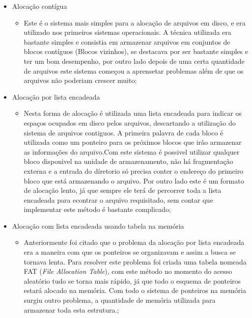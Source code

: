 \documentclass{article}
\begin{document}
\begin{itemize}

\item Alocação contígua

	\begin{itemize}
		\item Este é o sistema mais simples para a alocação de arquivos em disco, e era utilizado nos primeiros sistemas operacionais. A técnica utilizada era bastante simples e consistia em armazenar arquivos em conjuntos de blocos contíguos (Blocos vizinhos), se destacava por ser bastante simples e ter um bom desempenho, por outro lado depois de uma certa quantidade de arquivos este sistema começou a aprensetar problemas além de que os arquivos não poderiam crescer muito;
	\end{itemize}


\item Alocação por lista encadeada
	
	\begin{itemize}
		\item Nesta forma de alocação é utilizada uma lista encadeada para indicar os espaços ocupados em disco pelos arquivos, descartando a utilização do sistema de arquivos contiguos. A primeira palavra de cada bloco é utilizada como um ponteiro para os próximos blocos que irão armazenar as informações do arquivo.Com este sistema é possivel utilizar qualquer bloco disponivel na unidade de armazenamento, não há fragmentação externa e a entrada do díretorio só precisa conter o endereço do primeiro bloco que está armazenando o arquivo. Por outro lado este é um formato de alocação lento, já que sempre ele terá de percorrer toda a lista encadeada para econtrar o arquivo requisitado, sem contar que implementar este método é bastante complicado;
	\end{itemize}


\item Alocação com lista encadeada usando tabela na memória

	\begin{itemize}
		\item Anteriormente foi citado que o problema da alocação por lista encadeada era a maneira com que os ponteiros se organizavam e assim a busca se tornava lenta. Para resolver este problema foi criada uma tabela nomeada FAT (\textit{File Allocation Table}), com este método no momento do acesso aleatório tudo se torna mais rápido, já que todo o esquema de ponteiros estará alocado na memória. Com todo o sistema de ponteiros na memória surgiu outro problema, a quantidade de memória utilizada para armazenar toda esta estrutura.;
	\end{itemize}


\end{itemize}
\end{document}
